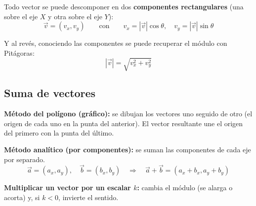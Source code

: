 \documentclass[12pt, letterpaper]{article}
\providecommand{\sen}{\sin}
\begin{document}
\begin{cuadroteoria}
  Todo vector se puede descomponer en dos \textbf{componentes rectangulares} (una sobre el eje $X$ y otra sobre el eje $Y$):
  $$\vec{v} = (v_x, v_y) \qquad \text{con} \qquad v_x = |\vec{v}| \cos \theta, \quad v_y = |\vec{v}| \sen \theta$$
  \begin{center}
  \end{center}
  Y al revés, conociendo las componentes se puede recuperar el módulo con Pitágoras:
  $$|\vec{v}| = \sqrt{v_x^2 + v_y^2}$$
\end{cuadroteoria}

\subsection{Suma de vectores}

\begin{cuadroteoria}
  \textbf{Método del polígono (gráfico):} se dibujan los vectores uno seguido de otro (el origen de cada uno en la punta del anterior). El vector resultante une el origen del primero con la punta del último.
  \begin{center}
  \end{center}

  \textbf{Método analítico (por componentes):} se suman las componentes de cada eje por separado.
  $$\vec{a} = (a_x, a_y), \quad \vec{b} = (b_x, b_y) \quad \Rightarrow \quad \vec{a} + \vec{b} = (a_x + b_x, a_y + b_y)$$

  \textbf{Multiplicar un vector por un escalar $k$:} cambia el módulo (se alarga o acorta) y, si $k < 0$, invierte el sentido.
\end{cuadroteoria}
\end{document}
